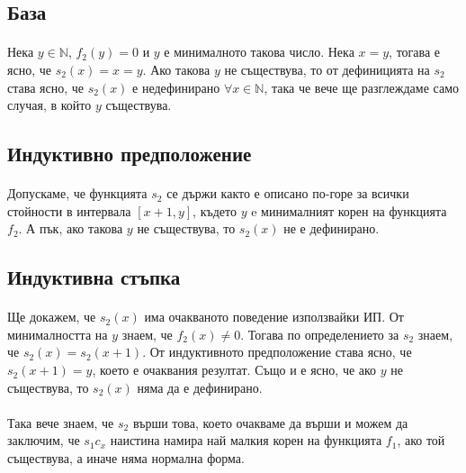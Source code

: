 \documentclass[12pt]{article}
\begin{document}
\subsection*{База}
\paragraph*{}
Нека $y \in \mathbb{N}$, $f_2(y) = 0$ и $y$ е минималното такова число. Нека $x = y$, тогава е ясно, че $s_2(x) = x = y$. Ако такова $y$ не съществува, то от дефиницията на $s_2$ става ясно, че $s_2(x)$ е недефинирано $\forall x \in \mathbb{N}$, така че вече ще разглеждаме само случая, в който $y$ съществува.

\subsection*{Индуктивно предположение}
\paragraph*{}
Допускаме, че функцията $s_2$ се държи както е описано по-горе за всички стойности в интервала $[x+1, y]$, където $y$ e минималният корен на функцията $f_2$. А пък, ако такова $y$ не съществува, то $s_2(x)$ не е дефинирано.   

\subsection*{Индуктивна стъпка}
\paragraph*{}
Ще докажем, че $s_2(x)$ има очакваното поведение използвайки ИП. От минималността на $y$ знаем, че $f_2(x) \neq 0$. Тогава по определението за $s_2$ знаем, че $s_2(x) = s_2(x+1)$. От индуктивното предположение става ясно, че $s_2(x+1) = y$, което е очаквания резултат. Също и е ясно, че ако $y$ не съществува, то $s_2(x)$ няма да е дефинирано. 

\paragraph*{}
Така вече знаем, че $s_2$ върши това, което очакваме да върши и можем да заключим, че $s_1 c_x$ наистина намира най малкия корен на функцията $f_1$, ако той съществува, а иначе няма нормална форма. 
\end{document}
